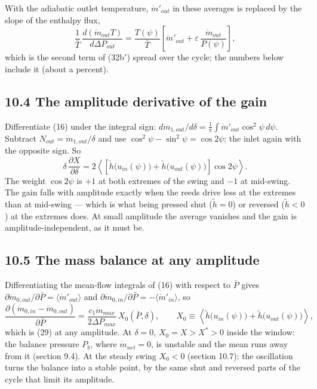 With the adiabatic outlet temperature, $\dot m'_{out}$ in these averages is replaced by the slope of the enthalpy flux,
\[
\frac{1}{\bar T}\,\frac{d(\dot m_{out}T)}{d\Delta P_{out}} = \frac{T(\psi)}{\bar T}\left[\dot m'_{out} + \varepsilon\,\frac{\dot m_{out}}{P(\psi)}\right],
\]
which is the second term of (32b$'$) spread over the cycle; the numbers below include it (about a percent).

\subsection*{10.4 The amplitude derivative of the gain}

Differentiate (16) under the integral sign: $d\dot m_{1,out}/d\delta = \frac{1}{\pi}\int\dot m'_{out}\cos^2\psi\,d\psi$. Subtract $N_{out} = \dot m_{1,out}/\delta$ and use $\cos^2\psi - \sin^2\psi = \cos 2\psi$; the inlet again with the opposite sign. So
\begin{equation}
\delta\,\frac{\partial X}{\partial\delta} = 2\left\langle\left[\tilde h\big(u_{in}(\psi)\big) + \tilde h\big(u_{out}(\psi)\big)\right]\cos 2\psi\right\rangle . \tag{38}
\end{equation}
The weight $\cos 2\psi$ is $+1$ at both extremes of the swing and $-1$ at mid-swing. The gain falls with amplitude exactly when the reeds drive less at the extremes than at mid-swing --- which is what being pressed shut ($\tilde h = 0$) or reversed ($\tilde h < 0$) at the extremes does. At small amplitude the average vanishes and the gain is amplitude-independent, as it must be.

\subsection*{10.5 The mass balance at any amplitude}

Differentiating the mean-flow integrals of (16) with respect to $\bar P$ gives $\partial\dot m_{0,out}/\partial\bar P = \langle\dot m'_{out}\rangle$ and $\partial\dot m_{0,in}/\partial\bar P = -\langle\dot m'_{in}\rangle$, so
\begin{equation}
\frac{\partial\left(\dot m_{0,in} - \dot m_{0,out}\right)}{\partial\bar P} = \frac{c_1\dot m_{max}}{2\Delta P_{max}}\,X_0(\bar P,\delta), \qquad
X_0 \equiv \left\langle\tilde h\big(u_{in}(\psi)\big) + \tilde h\big(u_{out}(\psi)\big)\right\rangle , \tag{39}
\end{equation}
which is (29) at any amplitude. At $\delta = 0$, $X_0 = X > X^* > 0$ inside the window: the balance pressure $P_b$, where $\dot m_{net} = 0$, is unstable and the mean runs away from it (section 9.4). At the steady swing $X_0 < 0$ (section 10.7): the oscillation turns the balance into a stable point, by the same shut and reversed parts of the cycle that limit its amplitude.

